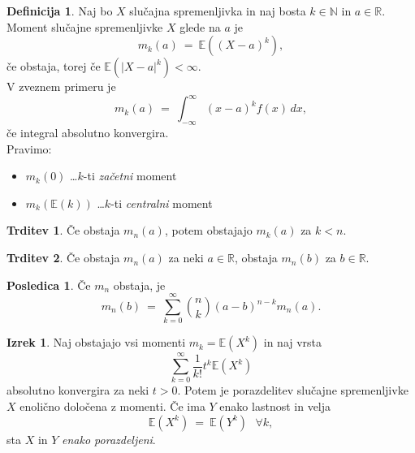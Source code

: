 \documentclass[11pt]{article}
\newcommand{\E}{\mathbb{E}}
\newcommand{\R}{\mathbb{R}}
\newcommand{\1}{\mathbbm{1}}
\newcommand{\N}{\mathbb{N}}
\theoremstyle{definition}
\newtheorem{definicija}{Definicija}[section]
\theoremstyle{definition}
\newtheorem{trditev}{Trditev}[section]
\theoremstyle{definition}
\newtheorem{izrek}{Izrek}[section]
\newtheorem*{posledica}{Posledica}
\begin{document}
\begin{definicija}

Naj bo $X$ slučajna spremenljivka in naj bosta $k \in \N$ in $a \in \R$. Moment slučajne spremenljivke $X$ glede na $a$ je
$$m_k(a) ~=~ \E((X-a)^k),$$
če obstaja, torej če $\E(|X-a|^k) < \infty$. \\

V zveznem primeru je
$$m_k(a) ~=~ \int_{-\infty}^\infty (x-a)^k f(x)\,dx,$$
če integral absolutno konvergira. \\

Pravimo:
\begin{itemize}
	\item $m_k(0)$ \ldots $k$-ti \textit{začetni} moment
	\item $m_k(\E(k))$ \ldots $k$-ti \textit{centralni} moment
\end{itemize}

\end{definicija}
\vspace{0.5cm}

\begin{trditev}

Če obstaja $m_n(a)$, potem obstajajo $m_k(a)$ za $k < n$.

\end{trditev}
\vspace{0.5cm}

\begin{trditev}

Če obstaja $m_n(a)$ za neki $a \in \R$, obstaja $m_n(b)$ za $b \in \R$.

\end{trditev}
\vspace{0.5cm}

\begin{posledica}

Če $m_n$ obstaja, je 
$$m_n(b) ~=~ \sum_{k=0}^\infty \binom{n}{k} (a-b)^{n-k} m_n(a).$$

\end{posledica}
\vspace{0.5cm}

\pagebreak
\begin{izrek}

Naj obstajajo vsi momenti $m_k = \E(X^k)$ in naj vrsta
$$\sum_{k=0}^\infty \frac{1}{k!} t^k \E(X^k)$$
absolutno konvergira za neki $t>0$. Potem je porazdelitev slučajne spremenljivke $X$ enolično določena z momenti. Če ima $Y$ enako lastnost in velja
$$\E(X^k) ~=~ \E(Y^k) ~~~\forall k,$$
sta $X$ in $Y$ \textit{enako porazdeljeni}.

\end{izrek}
\vspace{0.5cm}
\end{document}
